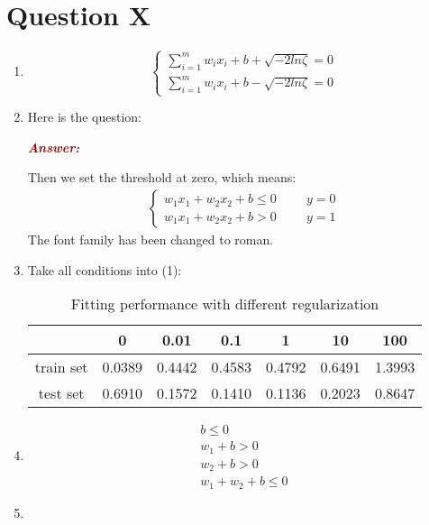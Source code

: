 \documentclass[12pt]{article}
\newenvironment{answer}
  {\par\noindent\itshape\textbf{\textcolor{darkred}{Answer:}}\par\nopagebreak\noindent\rmfamily}
  {\par\medskip}
\begin{document}
\section{Question X}
\begin{enumerate}[(1)]
	\item
	$$
	\left\{
	\begin{array}{ll}
		\sum_{i =1}^{m}w_ix_i + b + \sqrt{-2ln\zeta} = 0 \\
		\sum_{i =1}^{m}w_ix_i + b - \sqrt{-2ln\zeta} = 0
	\end{array}
	\right.
	$$
	\item Here is the question:\\
	\begin{answer}
	Then we set the threshold at zero, which means:
	\begin{equation}
		\begin{aligned}
			\left\{
			\begin{array}{ll}
				w_1x_1 + w_2x_2 + b \leq 0\hspace{1cm}y = 0 \\
				w_1x_1 + w_2x_2 + b > 0\hspace{1cm}y = 1
			\end{array}
			\right.
		\end{aligned}
	\end{equation}
	The font family has been changed to roman.
	\end{answer}
\item 
	Take all conditions into (1):
	\begin{table}[H]
		\centering
		\caption{Fitting performance with different regularization}
				\begin{tabular}{ |c|c|c|c|c|c|c|} 
					\hline
					\diagbox{MSE}{$\lambda$} & 0 & 0.01 &0.1 &1&10&100 \\ 
					\hline
					train set & 0.0389&	0.4442&	0.4583&	0.4792&	0.6491&	1.3993 \\ 
					\hline
					test set &0.6910&	0.1572&	0.1410&	0.1136&	0.2023&	0.8647\\
					\hline
				\end{tabular}
		\end{table}
\item
	\begin{align}
		b \leq 0\\
		w_1 + b > 0\\
		w_2 + b >0\\
		w_1 + w_2 + b \leq 0
	\end{align}
\item \begin{equation}

\end{equation}
\end{enumerate}
\end{document}
